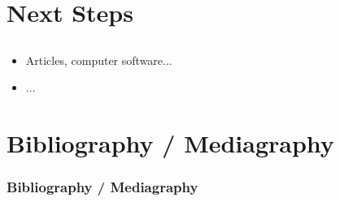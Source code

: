 \documentclass{beamer}
\begin{document}
\def\titleSectionSecondPart{Next Steps}
\section{\titleSectionSecondPart }
\def\titleSubSectionSecondPartOne{ Gathering information }
\subsection{ \titleSubSectionFirstPartOne }
\begin{frame}
	\frametitle{ \titleSubSectionFirstPartOne }
	\begin{itemize}
		\item Articles, computer software...
		\item ... 
	\end{itemize}
\end{frame}


\def\sectionPartBibliographie{Bibliography / Mediagraphy}
\section{\sectionPartBibliographie}
\begin{frame}
	\frametitle{\sectionPartBibliographie}
	\nocite{*}
	
	
\end{frame}
\end{document}
